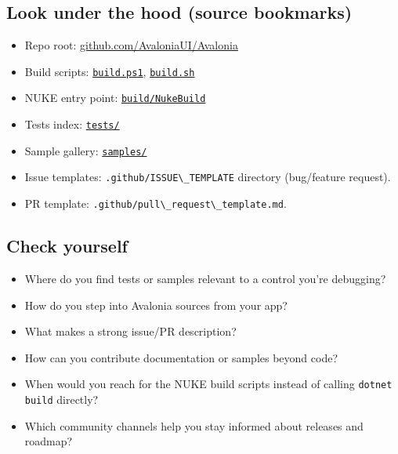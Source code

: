 \subsection{Look under the hood (source
bookmarks)}\label{look-under-the-hood-source-bookmarks-24}

\begin{itemize}
\tightlist
\item
  Repo root:
  \href{https://github.com/AvaloniaUI/Avalonia}{github.com/AvaloniaUI/Avalonia}
\item
  Build scripts:
  \href{https://github.com/AvaloniaUI/Avalonia/blob/master/build.ps1}{\passthrough{\lstinline!build.ps1!}},
  \href{https://github.com/AvaloniaUI/Avalonia/blob/master/build.sh}{\passthrough{\lstinline!build.sh!}}
\item
  NUKE entry point:
  \href{https://github.com/AvaloniaUI/Avalonia/tree/master/build/NukeBuild}{\passthrough{\lstinline!build/NukeBuild!}}
\item
  Tests index:
  \href{https://github.com/AvaloniaUI/Avalonia/tree/master/tests}{\passthrough{\lstinline!tests/!}}
\item
  Sample gallery:
  \href{https://github.com/AvaloniaUI/Avalonia/tree/master/samples}{\passthrough{\lstinline!samples/!}}
\item
  Issue templates: \passthrough{\lstinline!.github/ISSUE\_TEMPLATE!}
  directory (bug/feature request).
\item
  PR template:
  \passthrough{\lstinline!.github/pull\_request\_template.md!}.
\end{itemize}

\subsection{Check yourself}\label{check-yourself-25}

\begin{itemize}
\tightlist
\item
  Where do you find tests or samples relevant to a control you're
  debugging?
\item
  How do you step into Avalonia sources from your app?
\item
  What makes a strong issue/PR description?
\item
  How can you contribute documentation or samples beyond code?
\item
  When would you reach for the NUKE build scripts instead of calling
  \passthrough{\lstinline!dotnet build!} directly?
\item
  Which community channels help you stay informed about releases and
  roadmap?
\end{itemize}

